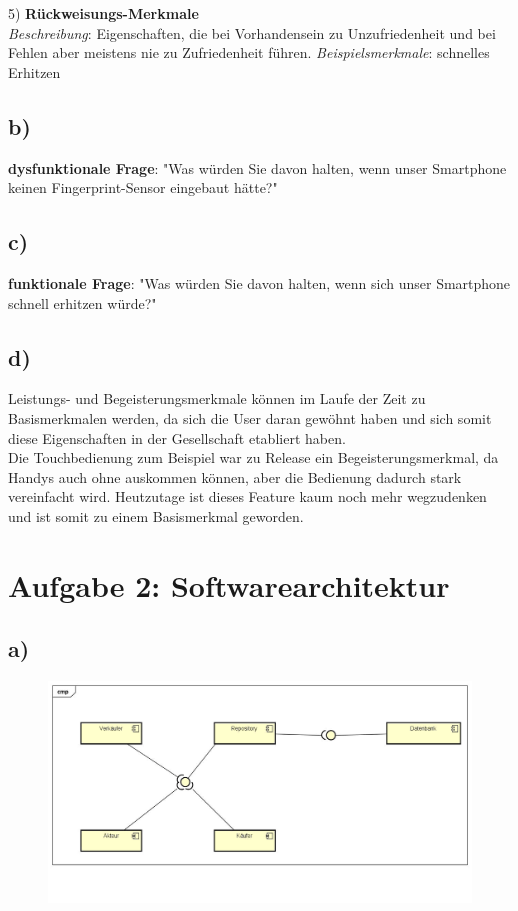 \documentclass[12pt,pdftex,a4paper]{article}
\begin{document}
5) \textbf{Rückweisungs-Merkmale}\\
\textit{Beschreibung}: Eigenschaften, die bei Vorhandensein zu Unzufriedenheit und bei Fehlen aber meistens nie zu Zufriedenheit führen.\newline
\textit{Beispielsmerkmale}: schnelles Erhitzen\\



\subsection*{b)}
\textbf{dysfunktionale Frage}: "Was würden Sie davon halten, wenn unser Smartphone keinen Fingerprint-Sensor eingebaut hätte?"
\subsection*{c)}
\textbf{funktionale Frage}: "Was würden Sie davon halten, wenn sich unser Smartphone schnell erhitzen würde?"
\subsection*{d)}
Leistungs- und Begeisterungsmerkmale können im Laufe der Zeit zu Basismerkmalen werden, da sich die User daran gewöhnt haben und sich somit diese Eigenschaften in der Gesellschaft etabliert haben.\\
Die Touchbedienung zum Beispiel war zu Release ein Begeisterungsmerkmal, da Handys auch ohne auskommen können, aber die Bedienung dadurch stark vereinfacht wird. Heutzutage ist dieses Feature kaum noch mehr wegzudenken und ist somit zu einem Basismerkmal geworden. 
\section*{Aufgabe 2: Softwarearchitektur}
\subsection*{a)}
\begin{figure}[htbp]
\centering
\includegraphics[width=1\textwidth]{a.png}
\end{figure}
\end{document}

